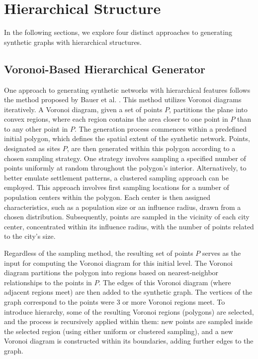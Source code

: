\section{Hierarchical Structure}

In the following sections, we explore four distinct approaches to generating synthetic graphs with hierarchical structures.

\subsection{Voronoi-Based Hierarchical Generator}

One approach to generating synthetic networks with hierarchical features follows the method proposed by Bauer et al. \cite{hutchison_synthetic_2010}.
This method utilizes Voronoi diagrams iteratively.
A Voronoi diagram, given a set of points \(P\), partitions the plane into convex regions, where each region contains the area closer to one point in \(P\) than to any other point in \(P\).
The generation process commences within a predefined initial polygon, which defines the spatial extent of the synthetic network.
Points, designated as sites \(P\), are then generated within this polygon according to a chosen sampling strategy.
One strategy involves sampling a specified number of points uniformly at random throughout the polygon's interior.
Alternatively, to better emulate settlement patterns, a clustered sampling approach can be employed.
This approach involves first sampling locations for a number of population centers within the polygon.
Each center is then assigned characteristics, such as a population size or an influence radius, drawn from a chosen distribution.
Subsequently, points are sampled in the vicinity of each city center, concentrated within its influence radius, with the number of points related to the city's size.

Regardless of the sampling method, the resulting set of points \(P\) serves as the input for computing the Voronoi diagram for this initial level.
The Voronoi diagram partitions the polygon into regions based on nearest-neighbor relationships to the points in \(P\).
The edges of this Voronoi diagram (where adjacent regions meet) are then added to the synthetic graph.
The vertices of the graph correspond to the points were 3 or more Voronoi regions meet.
To introduce hierarchy, some of the resulting Voronoi regions (polygons) are selected, and the process is recursively applied within them: new points are sampled inside the selected region (using either uniform or clustered sampling), and a new Voronoi diagram is constructed within its boundaries, adding further edges to the graph.

